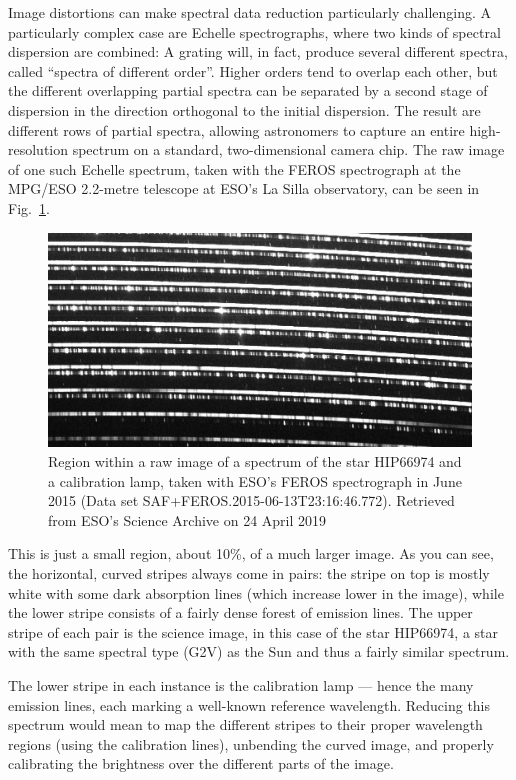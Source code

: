 \documentclass[twocolumn,apj]{openjournal}
\begin{document}
Image distortions can make spectral data reduction particularly challenging. A particularly complex case are Echelle spectrographs, where two kinds of spectral dispersion are combined: A grating will, in fact, produce several different spectra, called ``spectra of different order''. Higher orders tend to overlap each other, but the different overlapping partial spectra can be separated by a second stage of dispersion in the direction orthogonal to the initial dispersion. The result are different rows of partial spectra, allowing astronomers to capture an entire high-resolution spectrum on a standard, two-dimensional camera chip. The raw image of one such Echelle spectrum, taken with the FEROS spectrograph at the MPG/ESO 2.2-metre telescope at ESO's La Silla observatory, can be seen in Fig.~\ref{FEROSSpectrum}.
\begin{figure}[htbp]
\begin{center}
\includegraphics[width=\linewidth]{feros.jpg}
\caption{Region within a raw image of a spectrum of the star HIP66974 and a calibration lamp, taken with ESO's FEROS spectrograph in June 2015 (Data set SAF+FEROS.2015-06-13T23:16:46.772). Retrieved from ESO's Science Archive on 24 April 2019 }
\label{FEROSSpectrum}
\end{center}
\end{figure}
This is just a small region, about 10\%, of a much larger image. As you can see, the horizontal, curved stripes always come in pairs: the stripe on top is mostly white with some dark absorption lines (which increase lower in the image), while the lower stripe consists of a fairly dense forest of emission lines. The upper stripe of each pair is the science image, in this case of the star HIP66974, a star with the same spectral type (G2V) as the Sun and thus a fairly similar spectrum. 

The lower stripe in each instance is the calibration lamp --- hence the many emission lines, each marking a well-known reference wavelength. Reducing this spectrum would mean to map the different stripes to their proper wavelength regions (using the calibration lines), unbending the curved image, and properly calibrating the brightness over the different parts of the image.
\end{document}
